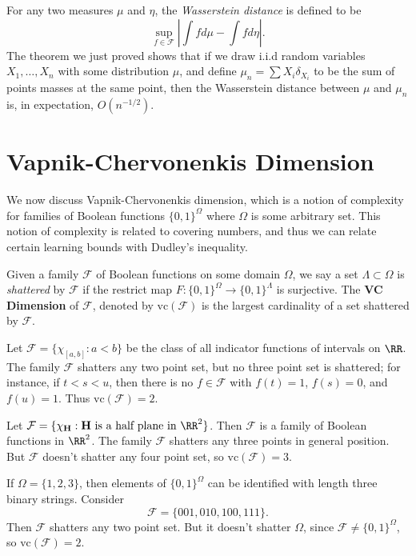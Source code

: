 \begin{remark}
	For any two measures $\mu$ and $\eta$, the {\it Wasserstein distance} is defined to be
	\[ \sup_{f \in \mathcal{F}} \left| \int f d\mu - \int f d\eta \right|. \]
	The theorem we just proved shows that if we draw i.i.d random variables $X_1, \dots, X_n$ with some distribution $\mu$, and define $\mu_n = \sum X_i \delta_{X_i}$ to be the sum of points masses at the same point, then the Wasserstein distance between $\mu$ and $\mu_n$ is, in expectation, $O(n^{-1/2})$.
\end{remark}

\section{Vapnik-Chervonenkis Dimension}

We now discuss Vapnik-Chervonenkis dimension, which is a notion of complexity for families of Boolean functions $\{ 0, 1 \}^\Omega$ where $\Omega$ is some arbitrary set. This notion of complexity is related to covering numbers, and thus we can relate certain learning bounds with Dudley's inequality.

Given a family $\mathcal{F}$ of Boolean functions on some domain $\Omega$, we say a set $\Lambda \subset \Omega$ is {\it shattered} by $\mathcal{F}$ if the restrict map $F: \{ 0, 1 \}^\Omega \to \{ 0, 1 \}^\Lambda$ is surjective. The \textbf{VC Dimension} of $\mathcal{F}$, denoted by $\text{vc}(\mathcal{F})$ is the largest cardinality of a set shattered by $\mathcal{F}$.

\begin{example}
	Let $\mathcal{F} = \{ \chi_{[a,b]} : a < b \}$ be the class of all indicator functions of intervals on $\RR$. The family $\mathcal{F}$ shatters any two point set, but no three point set is shattered; for instance, if $t < s < u$, then there is no $f \in \mathcal{F}$ with $f(t) = 1$, $f(s) = 0$, and $f(u) = 1$. Thus $\text{vc}(\mathcal{F}) = 2$.
\end{example}

\begin{example}
	Let $\mathcal{F} = \{ \chi_{\mathbf{H}} : \mathbf{H}\ \text{is a half plane in $\RR^2$} \}$. Then $\mathcal{F}$ is a family of Boolean functions in $\RR^2$. The family $\mathcal{F}$ shatters any three points in general position. But $\mathcal{F}$ doesn't shatter any four point set, so $\text{vc}(\mathcal{F}) = 3$.
\end{example}

\begin{example}
	If $\Omega = \{ 1, 2 ,3 \}$, then elements of $\{ 0, 1 \}^\Omega$ can be identified with length three binary strings. Consider
	\[ \mathcal{F} = \{ 001, 010, 100, 111 \}. \]
	Then $\mathcal{F}$ shatters any two point set. But it doesn't shatter $\Omega$, since $\mathcal{F} \neq \{ 0, 1 \}^\Omega$, so $\text{vc}(\mathcal{F}) = 2$.
\end{example}

